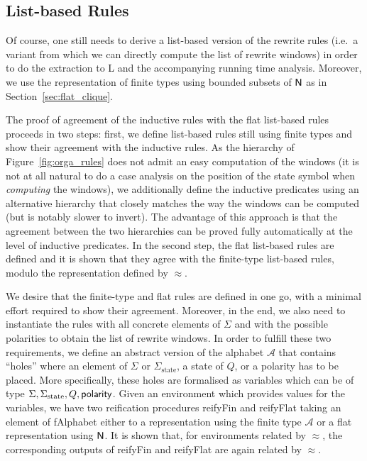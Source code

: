 \subsection{List-based Rules}
Of course, one still needs to derive a list-based version of the rewrite rules (i.e.\ a variant from which we can directly compute the list of rewrite windows) in order to do the extraction to L and the accompanying running time analysis. Moreover, we use the representation of finite types using bounded subsets of $\mathsf{N}$ as in Section~\ref{sec:flat_clique}. 

The proof of agreement of the inductive rules with the flat list-based rules proceeds in two steps: first, we define list-based rules still using finite types and show their agreement with the inductive rules. As the hierarchy of Figure~\ref{fig:orga_rules} does not admit an easy computation of the windows (it is not at all natural to do a case analysis on the position of the state symbol when \emph{computing} the windows), we additionally define the inductive predicates using an alternative hierarchy that closely matches the way the windows can be computed (but is notably slower to invert). The advantage of this approach is that the agreement between the two hierarchies can be proved fully automatically at the level of inductive predicates.
In the second step, the flat list-based rules are defined and it is shown that they agree with the finite-type list-based rules, modulo the representation defined by $\approx$. 

We desire that the finite-type and flat rules are defined in one go, with a minimal effort required to show their agreement.
Moreover, in the end, we also need to instantiate the rules with all concrete elements of $\Sigma$ and with the possible polarities to obtain the list of rewrite windows. 
In order to fulfill these two requirements, we define an abstract version  of the alphabet $\mathcal{A}$ that contains ``holes'' where an element of $\Sigma$ or $\Sigma_{\text{state}}$, a state of $Q$, or a polarity has to be placed. 
More specifically, these holes are formalised as variables which can be of type $\Sigma, \Sigma_{\text{state}}, Q, \textsf{polarity}$. 
Given an environment which provides values for the variables, we have two reification procedures \textsf{reifyFin}
and \textsf{reifyFlat} taking an element of \textsf{fAlphabet} either to a representation using the finite type $\mathcal{A}$ or a flat representation using $\mathsf{N}$.
It is shown that, for environments related by $\approx$, the corresponding outputs of \textsf{reifyFin} and \textsf{reifyFlat} are again related by $\approx$.

